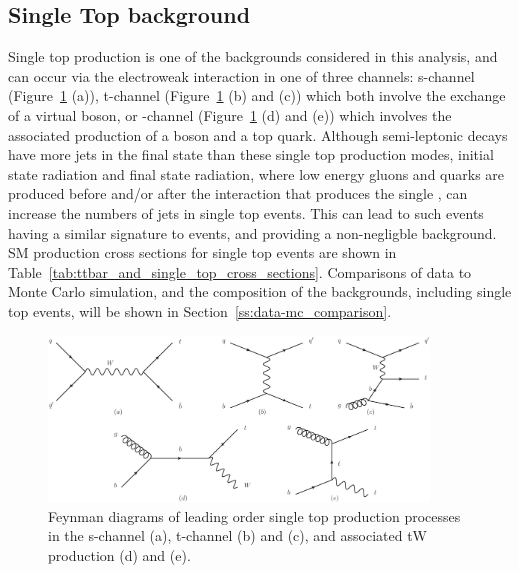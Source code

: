 \subsection{Single Top background}
\label{ss:single_top}
Single top production is one of the backgrounds considered in this analysis, and can occur via the electroweak
interaction in one of three channels: s-channel (Figure~\ref{fig:single_top_production} (a)), t-channel
(Figure~\ref{fig:single_top_production} (b) and (c)) which both involve the exchange of a virtual \W boson, or
\tW-channel (Figure~\ref{fig:single_top_production} (d) and (e)) which involves the associated production of a
\W boson and a top quark. Although semi-leptonic \ttbar decays have more jets in the final state than these
single top production modes, initial state radiation and final state radiation, where low energy gluons and
quarks are produced before and/or after the interaction that produces the single \tquark, can increase the
numbers of jets in single top events. This can lead to such events having a similar signature to \ttbar
events, and providing a non-negligble background. SM production cross sections for single top events are shown
in Table~\ref{tab:ttbar_and_single_top_cross_sections}. Comparisons of data to Monte Carlo simulation, and the
composition of the backgrounds, including single top events, will be shown in
Section~\ref{ss:data-mc_comparison}.

\begin{figure}[hbtp]
   \centering
     \includegraphics[width=0.9\textwidth]{Chapters/03_Theory/Images/single_top_production}\hfill
     \caption[Feynman diagrams of leading order single top production processes.]{Feynman diagrams of leading
     order single top production processes in the s-channel (a), t-channel (b) and (c), and associated tW
     production (d) and (e).}
     \label{fig:single_top_production}
\end{figure}

